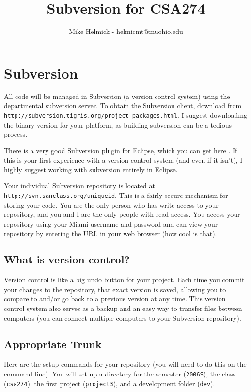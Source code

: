 \documentclass[10pt]{article}
\title{Subversion for CSA274}
\author{Mike Helmick - helmicmt@muohio.edu}
\newif\ifpdf
\begin{document}
\ifpdf
\DeclareGraphicsExtensions{.pdf, .jpg, .tif}
\else
{}
\fi

\maketitle

\section{Subversion}
All code will be managed in Subversion (a version control system) using the departmental subversion server.   To obtain the Subversion client, download from \newline
  {\tt http://subversion.tigris.org/project\_packages.html}.  \newline
I suggest downloading the binary version for your platform, as building subversion can be a tedious process.
\par
There is a very good Subversion plugin for Eclipse, which you can get here . \newline
 If this is your first experience with a version control system (and even if it isn't), I highly suggest working with subversion entirely in Eclipse.
\par
Your individual Subversion repository is located at {\tt http://svn.sanclass.org/uniqueid}.   This is a fairly secure mechanism for storing your code.   You are the only person who has write access to your repository, and you and I are the only people with read access.   You access your repository using your Miami username and password and can view your repository by entering the URL in your web browser (how cool is that).

\subsection{What is version control?}
Version control is like a big undo button for your project.   Each time you commit your changes to the repository, that exact version is saved, allowing you to compare to and/or go back to a previous version at any time.  This version control system also serves as a backup and an easy way to transfer files between computers (you can connect multiple computers to your Subversion repository).

\subsection{Appropriate Trunk}
Here are the setup commands for your repository (you will need to do this on the command line). You will set up a directory for the semester ({\tt 2006S}), the class ({\tt csa274}), the first project ({\tt project3}), and a development folder ({\tt dev}).
\end{document}
